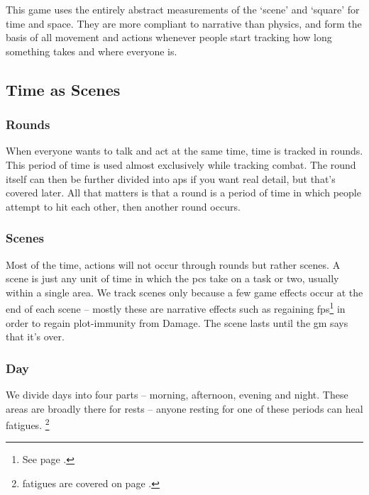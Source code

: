 \begin{multicols}{2}

\noindent
This game uses the entirely abstract measurements of the `scene' and `square' for time and space. They are more compliant to narrative than physics, and form the basis of all movement and actions whenever people start tracking how long something takes and where everyone is.

\subsection{Time as Scenes}
\label{time}

\subsubsection{Rounds}

When everyone wants to talk and act at the same time, time is tracked in \glspl{round}.
This period of time is used almost exclusively while tracking combat.
The \gls{round} itself can then be further divided into \glspl{ap} if you want real detail, but that's covered later.
All that matters is that a \gls{round} is a period of time in which people attempt to hit each other, then another \gls{round} occurs.

\subsubsection{Scenes}

Most of the time, actions will not occur through \glspl{round} but rather scenes. A scene is just any unit of time in which the \glspl{pc} take on a task or two, usually within a single area. We track scenes only because a few game effects occur at the end of each scene -- mostly these are narrative effects such as regaining \glspl{fp}\footnote{See page \pageref{fate_points}.} in order to regain plot-immunity from Damage. The scene lasts until the \gls{gm} says that it's over.

\subsubsection{Day}
\label{daytimes}

We divide days into four parts -- morning, afternoon, evening and night.
These areas are broadly there for rests -- anyone resting for one of these periods can heal \glspl{fatigue}.%
\footnote{\Glspl{fatigue} are covered on page \pageref{fatigue}.}


\end{multicols}
